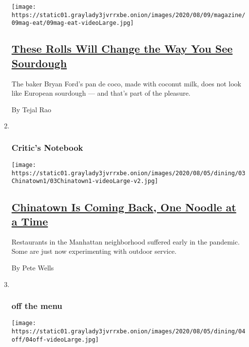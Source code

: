 \begin{enumerate}
  \texttt{[image: https://static01.graylady3jvrrxbe.onion/images/2020/08/09/magazine/09mag-eat/09mag-eat-videoLarge.jpg]}

  \hypertarget{these-rolls-will-change-the-way-you-see-sourdough}{%
  \subsection{\texorpdfstring{\href{/2020/08/05/magazine/pan-de-coco-recipe-bryan-ford.html}{These
  Rolls Will Change the Way You See
  Sourdough}}{These Rolls Will Change the Way You See Sourdough}}\label{these-rolls-will-change-the-way-you-see-sourdough}}

  The baker Bryan Ford's pan de coco, made with coconut milk, does not
  look like European sourdough --- and that's part of the pleasure.

  By Tejal Rao
\item ~
  \hypertarget{critics-notebook-1}{%
  \subsubsection{Critic's Notebook}\label{critics-notebook-1}}

  \texttt{[image: https://static01.graylady3jvrrxbe.onion/images/2020/08/05/dining/03Chinatown1/03Chinatown1-videoLarge-v2.jpg]}

  \hypertarget{chinatown-is-coming-back-one-noodle-at-a-time}{%
  \subsection{\texorpdfstring{\href{/2020/08/03/dining/chinatown-outdoor-dining-coronavirus.html}{Chinatown
  Is Coming Back, One Noodle at a
  Time}}{Chinatown Is Coming Back, One Noodle at a Time}}\label{chinatown-is-coming-back-one-noodle-at-a-time}}

  Restaurants in the Manhattan neighborhood suffered early in the
  pandemic. Some are just now experimenting with outdoor service.

  By Pete Wells
\item ~
  \hypertarget{off-the-menu}{%
  \subsubsection{off the menu}\label{off-the-menu}}

  \texttt{[image: https://static01.graylady3jvrrxbe.onion/images/2020/08/05/dining/04off/04off-videoLarge.jpg]}

  \hypertarget{a-new-rooftop-option-for-drinking-and-dining-at-pier-17}{%
}
\end{enumerate}
